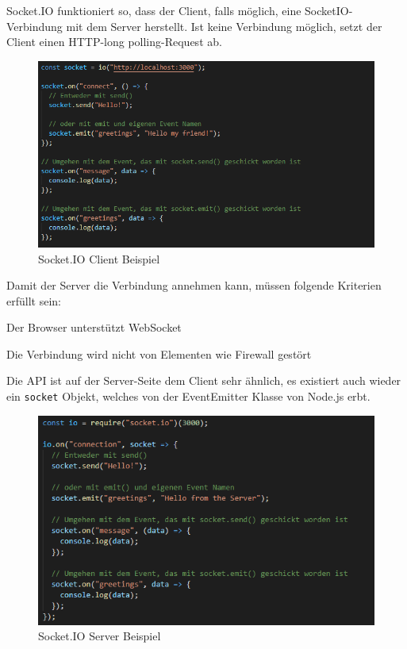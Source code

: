 Socket.IO funktioniert so, dass der Client, falls möglich, eine SocketIO-Verbindung mit dem Server herstellt.
Ist keine Verbindung möglich, setzt der Client einen HTTP-long polling-Request ab.

\begin{figure}[H]
    \centering
    \includegraphics[scale=1]{pics/SocketIO_client.PNG}
    \caption{Socket.IO Client Beispiel}
\end{figure}

Damit der Server die Verbindung annehmen kann, müssen folgende Kriterien erfüllt sein:
\begin{compactitem}
    \item Der Browser unterstützt WebSocket
    \item Die Verbindung wird nicht von Elementen wie Firewall gestört
\end{compactitem}
Die API ist auf der Server-Seite dem Client sehr ähnlich, es existiert auch wieder ein \texttt{socket} Objekt, welches von der EventEmitter Klasse von Node.js erbt.

\begin{figure}[H]
    \centering
    \includegraphics[scale=1]{pics/SocketIO_server.PNG}
    \caption{Socket.IO Server Beispiel}
\end{figure}


